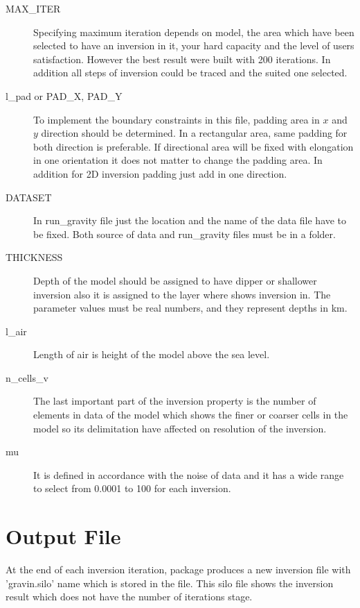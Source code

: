\begin{description} 	
\item[MAX\_ITER]
Specifying maximum iteration depends on model, the area which have been selected to have an inversion in it, your hard capacity and the level of users satisfaction. However the best result were built with 200 iterations. In addition all steps of inversion could be traced and the suited one selected.

\item[l_pad or PAD\_X, PAD\_Y] To implement the boundary constraints in this file, padding area in $x$ and $y$ direction should be determined. In a rectangular area, same padding for both direction is preferable. If directional area will be fixed with elongation in one orientation it does not matter to change the padding area. In addition for 2D inversion padding just add in one direction.

\item[DATASET] In run_gravity file just the location and the name of the data file have to be fixed. Both source of data and run_gravity files must be in a folder. 

\item[THICKNESS] Depth of the model should be assigned to have dipper or shallower inversion also it is assigned to the layer where shows inversion in. The parameter values must be real numbers, and they represent depths in km.

\item[l_air] Length of air is height of the model above the sea level. 

\item[n_cells_v] The last important part of the inversion property is the number of elements in data of the model which shows the finer or coarser cells in the model so its delimitation have affected on resolution of the inversion.

\item[mu]It is defined in accordance with the noise of data and it has a wide range to select from 0.0001 to 100 for each inversion.

\end{description}

\section{Output File}

At the end of each inversion iteration, package produces a new inversion file with 'gravin.silo' name which is stored in the file. This silo file shows the inversion result which does not have the number of iterations stage.

